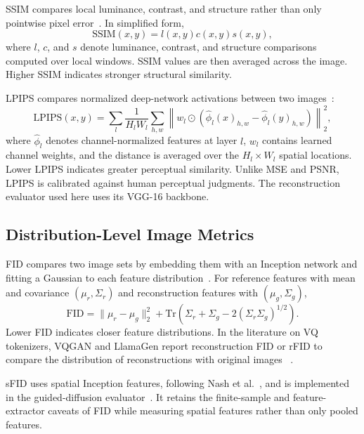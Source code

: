 SSIM compares local luminance, contrast, and structure rather than only pointwise pixel error~\cite{wang2004ssim}. In simplified form,
\begin{equation}
    \mathrm{SSIM}(x,y) = l(x,y)c(x,y)s(x,y),
\end{equation}
where $l$, $c$, and $s$ denote luminance, contrast, and structure comparisons computed over local windows. SSIM values are then averaged across the image. Higher SSIM indicates stronger structural similarity.

LPIPS compares normalized deep-network activations between two images~\cite{zhang2018unreasonable}:
\begin{equation}
    \mathrm{LPIPS}(x,y)
    = \sum_l \frac{1}{H_lW_l}\sum_{h,w}
    \left\lVert
    w_l \odot \left(\hat\phi_l(x)_{h,w}-\hat\phi_l(y)_{h,w}\right)
    \right\rVert_2^2,
\end{equation}
where $\hat\phi_l$ denotes channel-normalized features at layer $l$, $w_l$
contains learned channel weights, and the distance is averaged over the
$H_l\times W_l$ spatial locations. Lower LPIPS indicates greater perceptual
similarity. Unlike MSE and PSNR, LPIPS is calibrated against human perceptual
judgments. The reconstruction evaluator used here uses its VGG-16 backbone.

\subsection{Distribution-Level Image Metrics}
\label{subsec:distribution_metrics}

FID compares two image sets by embedding them with an Inception network and fitting a Gaussian to each feature distribution~\cite{heusel2017gans}. For reference features with mean and covariance $(\mu_r,\Sigma_r)$ and reconstruction features with $(\mu_g,\Sigma_g)$,
\begin{equation}
    \mathrm{FID}
    =
    \lVert \mu_r-\mu_g\rVert_2^2
    +
    \mathrm{Tr}\!\left(\Sigma_r+\Sigma_g-2(\Sigma_r\Sigma_g)^{1/2}\right).
\end{equation}
Lower FID indicates closer feature distributions. In the literature on VQ
tokenizers, VQGAN and LlamaGen report reconstruction FID or rFID to compare the
distribution of reconstructions with original images
~\cite{esser2021taming,sun2024llamagen}.

sFID uses spatial Inception features, following Nash et al.~\cite{nash2021generating}, and is implemented in the guided-diffusion evaluator~\cite{dhariwal2021diffusion,openaiguideddiffusionevals}. It retains the finite-sample and feature-extractor caveats of FID while measuring spatial features rather than only pooled features.

